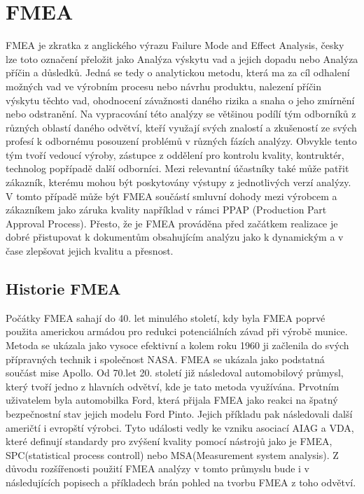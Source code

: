 \chapter{FMEA}
\label{sec:FMEA}
FMEA je zkratka z anglického výrazu Failure Mode and Effect Analysis, česky lze toto označení přeložit jako Analýza výskytu vad a jejich dopadu nebo Analýza příčin a důsledků. Jedná se tedy o analytickou metodu, která ma za cíl odhalení možných vad ve výrobním procesu nebo návrhu produktu, nalezení příčin výskytu těchto vad, ohodnocení závažnosti daného rizika a snaha o jeho zmírnění nebo odstranění. Na vypracování této analýzy se většinou podílí tým odborníků z různých oblastí daného odvětví, kteří využají svých znalostí a zkušeností ze svých profesí k odbornému posouzení problémů v různých fázích analýzy. Obvykle tento tým tvoří vedoucí výroby, zástupce z oddělení pro kontrolu kvality, kontruktér, technolog popřípadě další odborníci. Mezi relevantní účastníky také může patřit zákazník, kterému mohou být poskytovány výstupy z jednotlivých verzí analýzy. V tomto případě může být FMEA součástí smluvní dohody mezi výrobcem a zákazníkem jako záruka kvality například v rámci PPAP (Production Part Approval Process). Přesto, že je FMEA prováděna před začátkem realizace je dobré přistupovat k dokumentům obsahujícím analýzu jako k dynamickým a v čase zlepšovat jejich kvalitu a přesnost.  

\section{Historie FMEA}
Počátky FMEA sahají do 40. let minulého století, kdy byla FMEA poprvé použita americkou armádou pro redukci potenciálních závad při výrobě munice. Metoda se ukázala jako vysoce efektivní a kolem roku 1960 ji začlenila do svých přípravných technik i společnost NASA. FMEA se ukázala jako podstatná součást mise Apollo. Od 70.let 20. století již následoval automobilový průmysl, který tvoří jedno z hlavních odvětví, kde je tato metoda využívána. Prvotním uživatelem byla automobilka Ford, která přijala FMEA jako reakci na špatný bezpečnostní stav jejich modelu Ford Pinto. Jejich příkladu pak následovali další američtí i evropští výrobci. Tyto události vedly ke vzniku asociací AIAG a VDA, které definují standardy pro zvýšení kvality pomocí nástrojů jako je FMEA, SPC(statistical process controll) nebo MSA(Measurement system analysis). Z důvodu rozšířenosti použití FMEA analýzy v tomto průmyslu bude i v následujících popisech a příkladech brán pohled na tvorbu FMEA z toho odvětví.  

